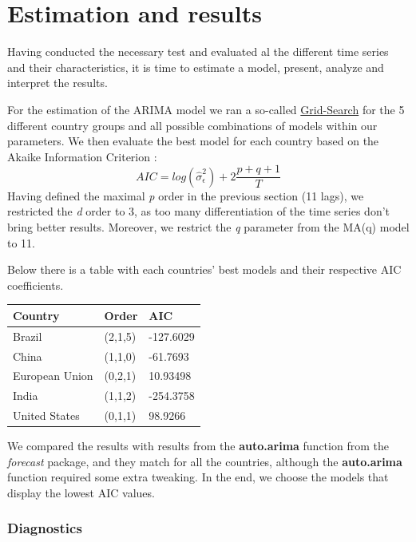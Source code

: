 \documentclass[
]{article}
\begin{document}
\newpage

\hypertarget{estimation-and-results}{%
\section{Estimation and results}\label{estimation-and-results}}

Having conducted the necessary test and evaluated al the different time
series and their characteristics, it is time to estimate a model,
present, analyze and interpret the results.

For the estimation of the ARIMA model we ran a so-called
\href{https://www.r-bloggers.com/2018/11/searching-for-the-optimal-hyper-parameters-of-an-arima-model-in-parallel-the-tidy-gridsearch-approach/}{Grid-Search}
for the 5 different country groups and all possible combinations of
models within our parameters. We then evaluate the best model for each
country based on the Akaike Information Criterion :
\[ AIC=log(\hat{\sigma}^2_{\epsilon}) + 2\frac{p+q+1}{T}\] Having
defined the maximal \emph{p} order in the previous section (11 lags), we
restricted the \emph{d} order to 3, as too many differentiation of the
time series don't bring better results. Moreover, we restrict the
\emph{q} parameter from the MA(q) model to 11.

Below there is a table with each countries' best models and their
respective AIC coefficients.

\begin{table}[H]
\centering
\begin{tabular}{l|l|l}
\hline
Country & Order & AIC\\
\hline
Brazil & (2,1,5) & -127.6029\\
\hline
China & (1,1,0) & -61.7693\\
\hline
European Union & (0,2,1) & 10.93498\\
\hline
India & (1,1,2) & -254.3758\\
\hline
United States & (0,1,1) & 98.9266\\
\hline
\end{tabular}
\end{table}

We compared the results with results from the \textbf{auto.arima}
function from the \emph{forecast} package, and they match for all the
countries, although the \textbf{auto.arima} function required some extra
tweaking. In the end, we choose the models that display the lowest AIC
values.

\hypertarget{diagnostics}{%
\subsubsection{Diagnostics}\label{diagnostics}}
\end{document}
